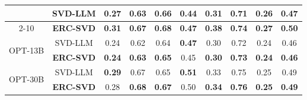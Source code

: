\begin{table}[t]
{\begin{tabular}{c|c|cccccccc}
                              & \cellcolor{white} SVD-LLM & \cellcolor{white} 0.27 & \cellcolor{white} 0.63 & \cellcolor{white} 0.66 & \cellcolor{white} 0.44 & \cellcolor{white} 0.31 & \cellcolor{white} 0.71 & \cellcolor{white} 0.26 & \cellcolor{white} 0.47 \\
        \cmidrule{2-10}
                               & \cellcolor{cyan!10} \textbf{ERC-SVD} & \cellcolor{cyan!10} \textbf{0.31} & \cellcolor{cyan!10} \textbf{0.67} & \cellcolor{cyan!10} \textbf{0.68} & \cellcolor{cyan!10} \textbf{0.47} & \cellcolor{cyan!10} \textbf{0.38} & \cellcolor{cyan!10} \textbf{0.74} & \cellcolor{cyan!10} \textbf{0.27} & \cellcolor{cyan!10} \textbf{0.50} \\

    \midrule
        \multirow{2}{*}{OPT-13B}
              
                              & \cellcolor{white} SVD-LLM & \cellcolor{white} 0.24 & \cellcolor{white} 0.62 & \cellcolor{white} 0.64 & \cellcolor{white} \textbf{0.47} & \cellcolor{white} 0.30 & \cellcolor{white} 0.72 & \cellcolor{white} 0.24 & \cellcolor{white} 0.46 \\
        \cmidrule{2-10}
                               & \cellcolor{cyan!10} \textbf{ERC-SVD} & \cellcolor{cyan!10} \textbf{0.24} & \cellcolor{cyan!10} \textbf{0.63} & \cellcolor{cyan!10} \textbf{0.65} & \cellcolor{cyan!10} 0.45 & \cellcolor{cyan!10} \textbf{0.30} & \cellcolor{cyan!10} \textbf{0.73} & \cellcolor{cyan!10} \textbf{0.24} & \cellcolor{cyan!10} \textbf{0.46} \\

    \midrule
        \multirow{2}{*}{OPT-30B}
              
                              & \cellcolor{white} SVD-LLM & \cellcolor{white} \textbf{0.29} & \cellcolor{white} 0.67 & \cellcolor{white} 0.65 & \cellcolor{white} \textbf{0.51} & \cellcolor{white} 0.33 & \cellcolor{white} 0.75 & \cellcolor{white} 0.25 & \cellcolor{white} 0.49 \\
        \cmidrule{2-10}
                               & \cellcolor{cyan!10} \textbf{ERC-SVD} & \cellcolor{cyan!10} 0.28 & \cellcolor{cyan!10} \textbf{0.68} & \cellcolor{cyan!10} \textbf{0.67} & \cellcolor{cyan!10} 0.50 & \cellcolor{cyan!10} \textbf{0.34} & \cellcolor{cyan!10} \textbf{0.76} & \cellcolor{cyan!10} \textbf{0.25} & \cellcolor{cyan!10} \textbf{0.49} \\
    \bottomrule
\end{tabular}
}
\end{table}

